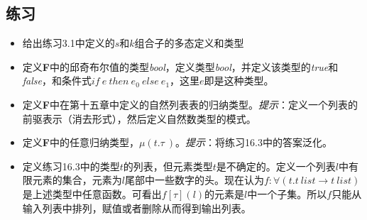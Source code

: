 \subsection{练习}
\begin{itemize}
  \item 给出练习3.1中定义的$s$和$k$组合子的多态定义和类型
  \item 定义\textbf{F}中的邱奇布尔值的类型\textit{bool}，定义类型\textit{bool}，并定义该类型的\textit{true}和\textit{false}，和条件式$if \ e \ then \ e_0 \ else \ e_1$，这里$e$即是这种类型。
  \item 定义\textbf{F}中在第十五章中定义的自然列表表的归纳类型。\textit{提示}：定义一个列表的前驱表示（消去形式），然后定义自然数类型的模式。
  \item 定义\textbf{F}中的任意归纳类型，$\mu (t.\tau \ )$。\textit{提示}：将练习16.3中的答案泛化。
  \item 定义练习16.3中的类型$t$的列表，但元素类型$t$是不确定的。定义一个列表$l$中有限元素的集合，元素为$l$尾部中一些数字的头。现在认为$f: \forall (t.t \ list \to t \ list)$是上述类型中任意函数。可看出$f[\tau](l)$的元素是$l$中一个子集。所以$f$只能从输入列表中排列，赋值或者删除从而得到输出列表。 
\end{itemize}